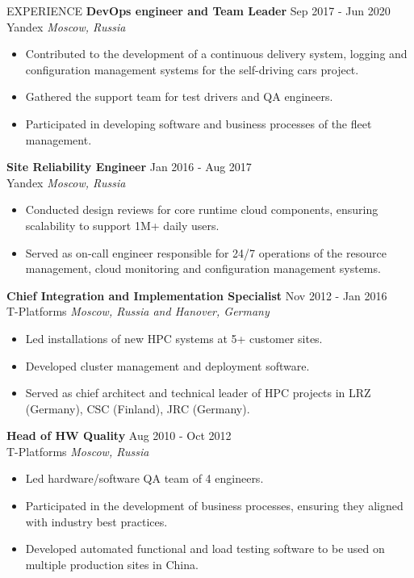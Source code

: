 \documentclass{resume} %
\begin{document}
\begin{rSection}{EXPERIENCE}
\textbf{DevOps engineer and Team Leader} \hfill Sep 2017 - Jun 2020\\
Yandex \hfill \textit{Moscow, Russia}
\begin{itemize}
   \itemsep -3pt {}
   \item Contributed to the development of a continuous delivery system, logging and configuration management systems for the self-driving cars project.
   \item Gathered the support team for test drivers and QA engineers.
   \item Participated in developing software and business processes of the fleet management.
\end{itemize}

\pagebreak

\textbf{Site Reliability Engineer} \hfill Jan 2016 - Aug 2017\\
Yandex \hfill \textit{Moscow, Russia}
\begin{itemize}
   \itemsep -3pt {}
   \item Conducted design reviews for core runtime cloud components, ensuring scalability to support 1M+ daily users.
   \item Served as on-call engineer responsible for 24/7 operations of the resource management, cloud monitoring and configuration management systems.
\end{itemize}

\textbf{Chief Integration and Implementation Specialist} \hfill Nov 2012 - Jan 2016\\
T-Platforms \hfill \textit{Moscow, Russia and Hanover, Germany}
\begin{itemize}
   \itemsep -3pt {}
   \item Led installations of new HPC systems at 5+ customer sites.
   \item Developed cluster management and deployment software.
   \item Served as chief architect and technical leader of HPC projects in LRZ (Germany), CSC (Finland), JRC (Germany).
\end{itemize}

\textbf{Head of HW Quality} \hfill Aug 2010 - Oct 2012\\
T-Platforms \hfill \textit{Moscow, Russia}
\begin{itemize}
   \itemsep -3pt {}
   \item Led hardware/software QA team of 4 engineers.
   \item Participated in the development of business processes, ensuring they aligned with industry best practices.
   \item Developed automated functional and load testing software to be used on multiple production sites in China.
\end{itemize}


\end{rSection}
\end{document}
